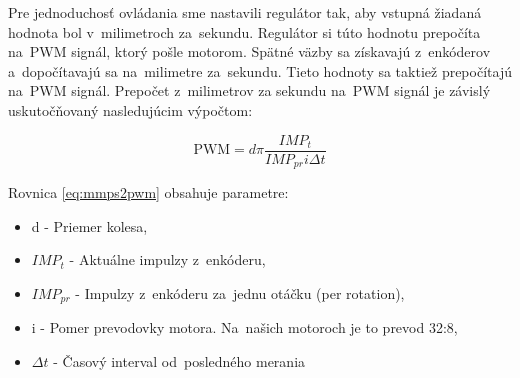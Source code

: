 Pre jednoduchosť ovládania sme nastavili regulátor tak, aby vstupná žiadaná hodnota bol v~milimetroch za~sekundu.
Regulátor si túto hodnotu prepočíta na~PWM signál, ktorý pošle motorom. Spätné väzby sa získavajú z~enkóderov
a~dopočítavajú sa na~milimetre za~sekundu. Tieto hodnoty sa taktiež prepočítajú na~PWM signál. Prepočet z~milimetrov
za sekundu na~PWM signál je závislý uskutočňovaný nasledujúcim výpočtom:

\begin{equation}
	\text{PWM} = d \pi \frac{IMP_t}{IMP_{pr} i \Delta t}
	\label{eq:mmps2pwm}
\end{equation}

Rovnica \ref{eq:mmps2pwm} obsahuje parametre:
\begin{itemize}
	\item d - Priemer kolesa,
	\item $IMP_t$ - Aktuálne impulzy z~enkóderu,
	\item $IMP_{pr}$ - Impulzy z~enkóderu za~jednu otáčku (per rotation),
	\item i - Pomer prevodovky motora. Na~našich motoroch je to prevod 32:8,
	\item $\Delta t$ - Časový interval od~posledného merania
\end{itemize}

